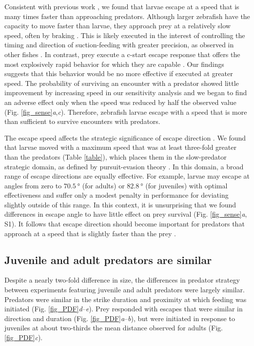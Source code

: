 \documentclass[]{rsos}%
\begin{document}
Consistent with previous work \cite{Stewart:2013bha}, we found that larvae escape at a speed that is many times faster than approaching predators.
Although larger zebrafish have the capacity to move faster than larvae, they approach prey at a relatively slow speed, often by braking \cite{McHenry:2005tc}.
This is likely executed in the interest of controlling the timing and direction of suction-feeding with greater precision, as observed in other fishes \cite{Higham:2005iu,Higham:2007go}.
In contrast, prey execute a c-start escape response that offers the most explosively rapid behavior for which they are capable \cite{Muller:2004hp}.
Our findings suggests that this behavior would be no more effective if executed at greater speed.
The probability of surviving an encounter with a predator showed little improvement by increasing speed in our sensitivity analysis and we began to find an adverse effect only when the speed was reduced by half the observed value (Fig. \ref{fig_sense}\textit{a},\textit{c}).
Therefore, zebrafish larvae escape with a speed that is more than sufficient to survive encounters with predators.

The escape speed affects the strategic significance of escape direction \cite{Isaacs:1965uz,Weihs:1984tb}.
We found that larvae moved with a maximum speed that was at least three-fold greater than the predators (Table \ref{table}), which places them in the slow-predator strategic domain, as defined by pursuit-evasion theory \cite{Soto:2015cj}.
In this domain, a broad range of escape directions are equally effective.
For example, larvae may escape at angles from zero to $\SI{70.5}{\degree}$ (for adults) or $\SI{82.8}{\degree}$ (for juveniles) with optimal effectiveness \cite{Soto:2015cj} and suffer only a modest penalty in performance for deviating slightly outside of this range. 
In this context, it is unsurprising that we found differences in escape angle to have little effect on prey survival (Fig. \ref{fig_sense}\textit{a}, S1).
It follows that escape direction should become important for predators that approach at a speed that is slightly faster than the prey \cite{Soto:2015cj}. 

\subsection{Juvenile and adult predators are similar} 

Despite a nearly two-fold difference in size, the differences in predator strategy between experiments featuring juvenile and adult predators were largely similar.
Predators were similar in the strike duration and proximity at which feeding was initiated (Fig. \ref{fig_PDF}\textit{d}--\textit{e}).
Prey responded with escapes that were similar in direction and duration (Fig. \ref{fig_PDF}\textit{a}--\textit{b}), but were initiated in response to juveniles at about two-thirds the mean distance observed for adults (Fig. \ref{fig_PDF}\textit{c}).
\end{document}
